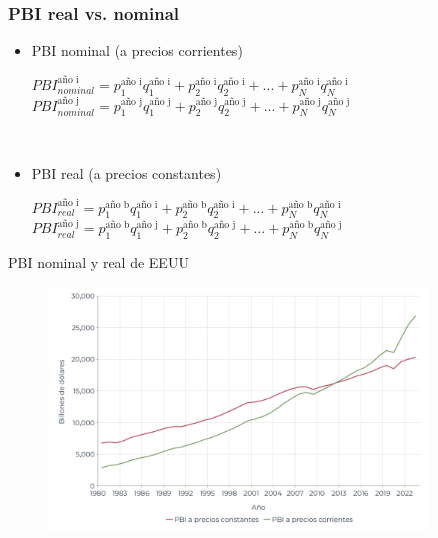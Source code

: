 \documentclass{beamer}
\begin{document}
\begin{frame}
\frametitle{PBI real vs. nominal}
\begin{itemize}
        \item PBI nominal (a precios corrientes) 
         \\ \vspace{1mm}
        \begin{center} \small{
            $PBI_{nominal}^{\text{año i}}=p_{1}^{\text{año i}}q_{1}^{\text{año i}}+p_{2}^{\text{año i}}q_{2}^{\text{año i}}+...+p_{N}^{\text{año i}}q_{N}^{\text{año i}}$}
            \\ \vspace{1mm}
            \small{
            $PBI_{nominal}^{\text{año j}}=p_{1}^{\text{año j}}q_{1}^{\text{año j}}+p_{2}^{\text{año j}}q_{2}^{\text{año j}}+...+p_{N}^{\text{año j}}q_{N}^{\text{año j}}$}
        \end{center}
         \\ \vspace{1mm}
        \item PBI real (a precios constantes) 
         \\ \vspace{1mm}
         \begin{center} \small{
            $PBI_{real}^{\text{año i}}=p_{1}^{\text{año b}}q_{1}^{\text{año i}}+p_{2}^{\text{año b}}q_{2}^{\text{año i}}+...+p_{N}^{\text{año b}}q_{N}^{\text{año i}}$}
            \\ \vspace{1mm}
            \small{
            $PBI_{real}^{\text{año j}}=p_{1}^{\text{año b}}q_{1}^{\text{año j}}+p_{2}^{\text{año b}}q_{2}^{\text{año j}}+...+p_{N}^{\text{año b}}q_{N}^{\text{año j}}$}
        \end{center}
        
\end{itemize}
\end{frame}


\begin{frame}{PBI nominal y real de EEUU}
    \begin{figure} [H]   \includegraphics[width=0.9\textwidth]{Slides Principios de Economia/Figures/29.8.pdf}
\end{figure}
\end{frame}
 
\end{document}
